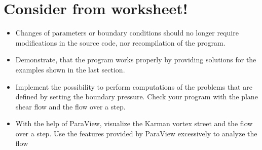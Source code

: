 \documentclass[a4paper]{article}
\begin{document}
\section{Consider from worksheet!}
\begin{itemize}
\item Changes of parameters or boundary conditions should no longer require modifications in the source code, nor recompilation of the program.
\item Demonstrate, that the program works properly by providing solutions for the examples shown in the last section.
\item Implement the possibility to perform computations of the problems that are defined by setting the boundary pressure. Check your program with the plane shear flow and the flow over a step.
\item With the help of ParaView, visualize the Karman vortex street and the flow over a step. Use the features provided by ParaView excessively to analyze the flow
\end{itemize}
\end{document}
